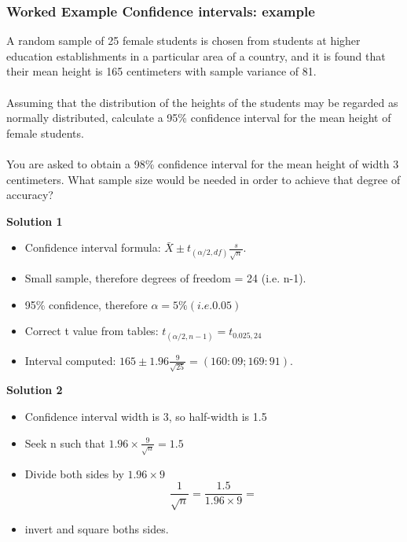 \subsubsection{Worked Example Confidence intervals: example}

\noindent A random sample of 25 female students is chosen from
students at higher education establishments in a particular area
of a country, and it is found that their mean height is 165
centimeters with sample variance of 81.
\\
\\
Assuming that the distribution of the heights of the students may
be regarded as normally distributed, calculate a 95\% confidence
interval for the mean height of female students.
\\
\\
You are asked to obtain a 98\% confidence interval for the mean
height of width 3 centimeters. What sample size would be needed in
order to achieve that degree of accuracy?

\noindent \textbf{Solution 1}

\begin{itemize}
\item Confidence interval formula: $\bar{X} \pm t_{(\alpha/2,df)}
\frac{s}{\sqrt{n}}$.

\item Small sample, therefore degrees of freedom = 24 (i.e. n-1).

\item 95\% confidence, therefore $\alpha = 5\% (i.e. 0.05)$

\item Correct t value from tables: $t_{(\alpha /2,n-1)} =
t_{0.025,24} $

\item Interval computed: $165 \pm 1.96 \frac{9}{\sqrt{25}}  =
(160:09; 169:91).$
\end{itemize}


\noindent \textbf{Solution 2}

\begin{itemize}
\item Confidence interval width is 3, so half-width is 1.5

\item Seek n such that $1.96 \times \frac{9}{\sqrt{n}} = 1.5$

\item Divide both sides by $1.96 \times 9$ \\
\[\frac{1}{\sqrt{n}} = \frac{1.5}{1.96 \times 9} =\]


\item invert and square boths sides.
\end{itemize}


